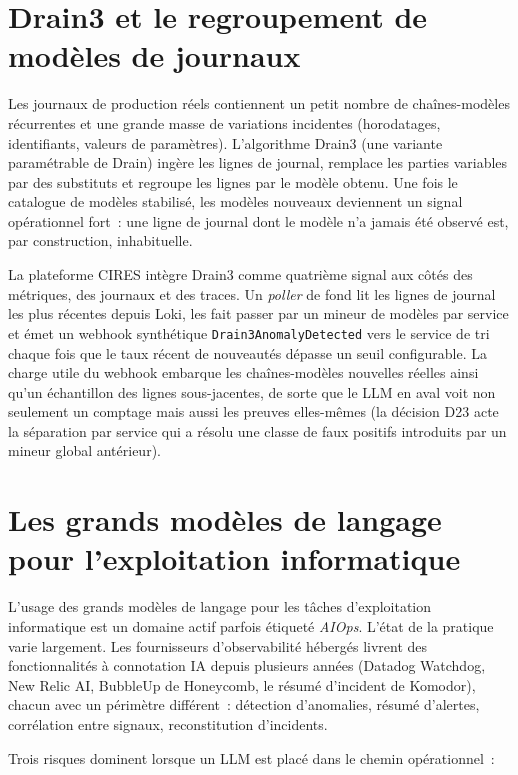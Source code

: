 \documentclass[11pt,a4paper,oneside]{report}
\begin{document}
\section{Drain3 et le regroupement de modèles de journaux}

Les journaux de production réels contiennent un petit nombre de
chaînes-modèles récurrentes et une grande masse de variations
incidentes (horodatages, identifiants, valeurs de paramètres).
L'algorithme Drain3 (une variante paramétrable de Drain) ingère les
lignes de journal, remplace les parties variables par des
substituts et regroupe les lignes par le modèle obtenu. Une fois le
catalogue de modèles stabilisé, les modèles nouveaux deviennent un
signal opérationnel fort~: une ligne de journal dont le modèle n'a
jamais été observé est, par construction, inhabituelle.

La plateforme CIRES intègre Drain3 comme quatrième signal aux côtés
des métriques, des journaux et des traces. Un \emph{poller} de fond
lit les lignes de journal les plus récentes depuis Loki, les fait
passer par un mineur de modèles par service et émet un webhook
synthétique \texttt{Drain3AnomalyDetected} vers le service de tri
chaque fois que le taux récent de nouveautés dépasse un seuil
configurable. La charge utile du webhook embarque les chaînes-modèles
nouvelles réelles ainsi qu'un échantillon des lignes sous-jacentes,
de sorte que le LLM en aval voit non seulement un comptage mais aussi
les preuves elles-mêmes (la décision D23 acte la séparation par
service qui a résolu une classe de faux positifs introduits par un
mineur global antérieur).

\section{Les grands modèles de langage pour l'exploitation informatique}

L'usage des grands modèles de langage pour les tâches d'exploitation
informatique est un domaine actif parfois étiqueté \emph{AIOps}.
L'état de la pratique varie largement. Les fournisseurs d'observabilité
hébergés livrent des fonctionnalités à connotation IA depuis
plusieurs années (Datadog Watchdog, New Relic AI, BubbleUp de
Honeycomb, le résumé d'incident de Komodor), chacun avec un
périmètre différent~: détection d'anomalies, résumé d'alertes,
corrélation entre signaux, reconstitution d'incidents.

Trois risques dominent lorsque un LLM est placé dans le chemin
opérationnel~:
\end{document}
